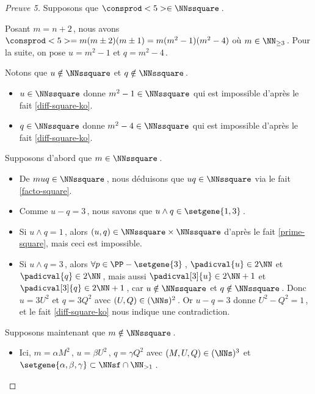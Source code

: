 \begin{proof}[Preuve 5]%
	Supposons que $\consprod<5> \in \NNssquare$\,.
	
    \smallskip
    
    Posant $m = n+2$\,, nous avons $\consprod<5> = m (m \pm 2) (m \pm 1) = m(m^2 - 1)(m^2 - 4)$ où $m \in \NN_{\geq 3}$\,.
	Pour la suite, on pose $u = m^2 - 1$ et $q = m^2 - 4$\,.

	\medskip
	
	Notons que $u \notin \NNssquare$ et $q \notin \NNssquare$\,.
	\begin{itemize}
		\item $u \in \NNssquare$ donne $m^2 - 1 \in \NNssquare$ qui est impossible d'après le fait \ref{diff-square-ko}.

		\item $q \in \NNssquare$ donne $m^2 - 4 \in \NNssquare$ qui est impossible d'après le fait \ref{diff-square-ko}.
	\end{itemize}

	\medskip
	
	Supposons d'abord que $m \in \NNssquare$\,.
	\begin{itemize}
		\item De $muq \in \NNssquare$\,, nous déduisons que $uq \in \NNssquare$ via le fait \ref{facto-square}.

		\item Comme $u - q = 3$\,, nous savons que $u \wedge q \in \setgene{1, 3}$\,.

		\item Si $u \wedge q = 1$\,, 
		alors $(u, q) \in \NNssquare \times \NNssquare$ d'après le fait \ref{prime-square}, mais ceci est impossible.

		\item Si $u \wedge q = 3$\,, 
		alors $\forall p \in \PP - \setgene{3}$\,, 
		$\padicval{u} \in 2 \NN$ et $\padicval{q} \in 2 \NN$\,,
		mais aussi $\padicval[3]{u} \in 2 \NN + 1$ et $\padicval[3]{q} \in 2 \NN + 1$\,, car  $u \notin \NNssquare$ et $q \notin \NNssquare$\,.
		Donc 
		$u = 3 U^2$ et $q = 3 Q^2$ avec $(U, Q) \in ( \NNs )^2$\,.
		Or $u - q = 3$ donne $U^2 - Q^2 = 1$\,, et le fait \ref{diff-square-ko} nous indique une contradiction.
	\end{itemize}
	
	\medskip
	
	Supposons maintenant que $m \notin \NNssquare$\,.
	\begin{itemize}
		\item Ici, $m = \alpha M^2$\,, $u = \beta U^2$\,, $q = \gamma Q^2$ avec $(M, U, Q) \in ( \NNs )^3$ et $\setgene{\alpha, \beta, \gamma} \subset \NNsf \cap \NN_{>1}$\,.



\end{itemize}
\end{proof}
